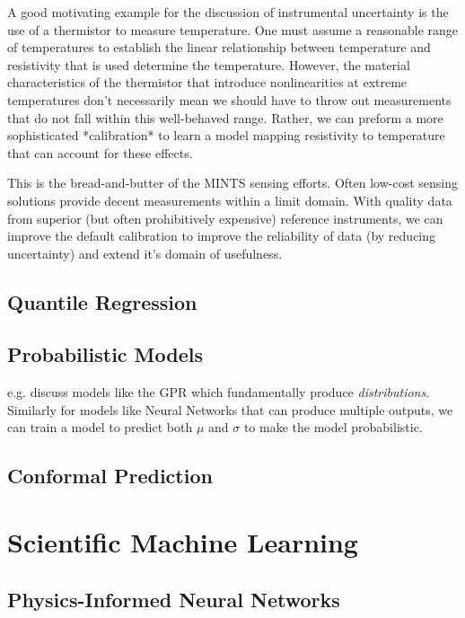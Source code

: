 A good motivating example for the discussion of instrumental uncertainty is the use of a thermistor to measure temperature. One must assume a reasonable range of temperatures to establish the linear relationship between temperature and resistivity that is used determine the temperature. However, the material characteristics of the thermistor that introduce nonlinearities at extreme temperatures don't necessarily mean we should have to throw out measurements that do not fall within this well-behaved range. Rather, we can preform a more sophisticated *calibration* to learn a model mapping resistivity to temperature that can account for these effects.

This is the bread-and-butter of the MINTS sensing efforts. Often low-cost sensing solutions provide decent measurements within a limit domain. With quality data from superior (but often prohibitively expensive) reference instruments, we can improve the default calibration to improve the reliability of data (by reducing uncertainty) and extend it's domain of usefulness.

\subsection{Quantile Regression}
\subsection{Probabilistic Models}
e.g. discuss models like the GPR which fundamentally produce \textit{distributions}. Similarly for models like Neural Networks that can produce multiple outputs, we can train a model to predict both $\mu$ and $\sigma$ to make the model probabilistic.

\subsection{Conformal Prediction}




\section{Scientific Machine Learning}
\subsection{Physics-Informed Neural Networks}
